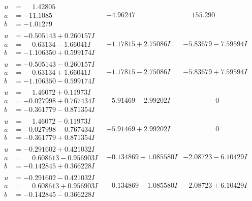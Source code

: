 \documentclass[1p]{elsarticle_modified}
\theoremstyle{definition}
\begin{document}
$$\begin{array}{c|c|c}
\begin{aligned}
u &= \phantom{-}1.42805\phantom{ +0.000000I} \\
a &= -11.1085\phantom{ +0.000000I} \\
b &= -1.01279\phantom{ +0.000000I}\end{aligned}
 & -4.96247\phantom{ +0.000000I} & \phantom{-}155.290\phantom{ +0.000000I} \\ \hline\begin{aligned}
u &= -0.505143 + 0.260157 I \\
a &= \phantom{-}0.63134 - 1.66041 I \\
b &= -1.106350 + 0.599174 I\end{aligned}
 & -1.17815 + 2.75086 I & -5.83679 - 7.59594 I \\ \hline\begin{aligned}
u &= -0.505143 - 0.260157 I \\
a &= \phantom{-}0.63134 + 1.66041 I \\
b &= -1.106350 - 0.599174 I\end{aligned}
 & -1.17815 - 2.75086 I & -5.83679 + 7.59594 I \\ \hline\begin{aligned}
u &= \phantom{-}1.46072 + 0.11973 I \\
a &= -0.027998 + 0.767434 I \\
b &= -0.361779 - 0.871354 I\end{aligned}
 & -5.91469 - 2.99202 I & \phantom{-0.000000 } 0 \\ \hline\begin{aligned}
u &= \phantom{-}1.46072 - 0.11973 I \\
a &= -0.027998 - 0.767434 I \\
b &= -0.361779 + 0.871354 I\end{aligned}
 & -5.91469 + 2.99202 I & \phantom{-0.000000 } 0 \\ \hline\begin{aligned}
u &= -0.291602 + 0.421032 I \\
a &= \phantom{-}0.608613 - 0.956903 I \\
b &= -0.142845 + 0.366228 I\end{aligned}
 & -0.134869 + 1.085580 I & -2.08723 - 6.10429 I \\ \hline\begin{aligned}
u &= -0.291602 - 0.421032 I \\
a &= \phantom{-}0.608613 + 0.956903 I \\
b &= -0.142845 - 0.366228 I\end{aligned}
 & -0.134869 - 1.085580 I & -2.08723 + 6.10429 I \\ \hline\begin{aligned}

\end{aligned}
\end{array}$$
\end{document}
